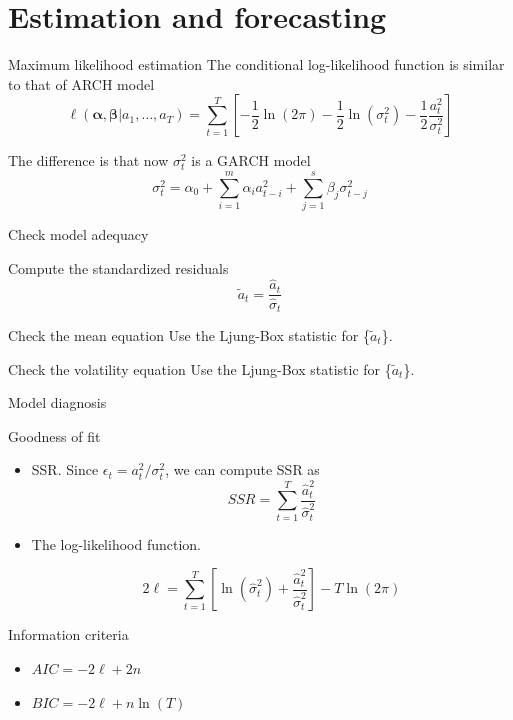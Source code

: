 \documentclass[presentation,10pt]{beamer}
\begin{document}
\section{Estimation and forecasting}
\label{sec:orgb368a05}

\begin{frame}[label={sec:orgc25a44b}]{Maximum likelihood estimation}
The conditional log-likelihood function is similar to that of ARCH model
\begin{equation}
\label{eq:arch-logL}
\ell(\boldsymbol{\alpha}, \boldsymbol{\beta} | a_1, \ldots, a_T) = 
\sum_{t=1}^T \left[ -\frac{1}{2} \ln(2\pi) - \frac{1}{2} \ln(\sigma^2_t) - \frac{1}{2} \frac{a^2_t}{\sigma^2_t}  \right]
\end{equation}

The difference is that now \(\sigma^2_t\) is a GARCH model
\[\sigma^2_t = \alpha_0 + \sum_{i=1}^m \alpha_i a^2_{t-i} +
\sum_{j=1}^s \beta_j \sigma^2_{t-j} \]
\end{frame}

\begin{frame}[label={sec:orgc47dced}]{Check model adequacy}
\begin{block}{Compute the standardized residuals}
\[ \tilde{a}_t = \frac{\hat{a}_t}{\hat{\sigma}_t} \]
\end{block}

\begin{block}{Check the mean equation}
Use the Ljung-Box statistic for \{\(\tilde{a}_t\)\}.
\end{block}

\begin{block}{Check the volatility equation}
Use the Ljung-Box statistic for \{\(\tilde{a}_t\)\}.
\end{block}
\end{frame}

\begin{frame}[label={sec:org4c50b83}]{Model diagnosis}
\begin{block}{Goodness of fit}
\begin{itemize}
\item SSR. Since \(\epsilon_t = a^2_t / \sigma^2_t\), we can compute SSR as
\[ SSR = \sum_{t=1}^T \frac{\hat{a}^2_t}{\hat{\sigma}^2_t} \]

\item The log-likelihood function. 

\[2\ell = \sum_{t=1}^T \left[ \ln(\hat{\sigma}^2_t) + \frac{\hat{a}^2_t}{\hat{\sigma}^2_t}
  \right] - T\ln(2\pi) \]
\end{itemize}
\end{block}

\begin{block}{Information criteria}
\begin{itemize}
\item \(AIC = -2\ell + 2n\)
\item \(BIC = -2\ell + n \ln(T)\)
\end{itemize}
\end{block}
\end{frame}
\end{document}
